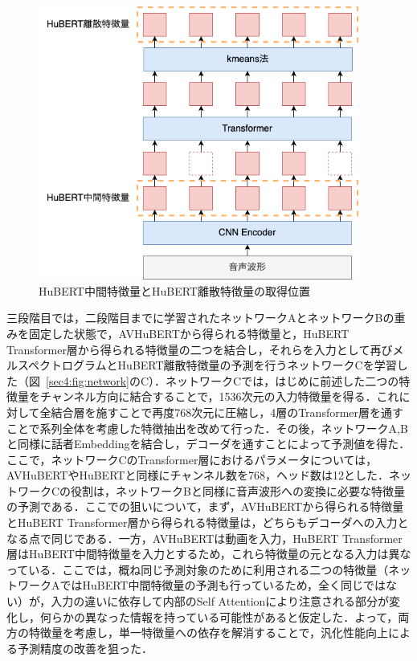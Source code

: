\documentclass[12pt]{jarticle}
\numberwithin{equation}{section}    %
\numberwithin{figure}{section}      %
\numberwithin{table}{section}      %
\begin{document}
\begin{figure}[bt]
    \centering
    \includegraphics[height=90mm]{./figure/sec4/model/hubert.png}
    \caption{HuBERT中間特徴量とHuBERT離散特徴量の取得位置}
    \label{sec4:fig:hubert}
\end{figure}

三段階目では，二段階目までに学習されたネットワークAとネットワークBの重みを固定した状態で，AVHuBERTから得られる特徴量と，HuBERT Transformer層から得られる特徴量の二つを結合し，それらを入力として再びメルスペクトログラムとHuBERT離散特徴量の予測を行うネットワークCを学習した（図~\ref{sec4:fig:network}のC）．ネットワークCでは，はじめに前述した二つの特徴量をチャンネル方向に結合することで，1536次元の入力特徴量を得る．これに対して全結合層を施すことで再度768次元に圧縮し，4層のTransformer層を通すことで系列全体を考慮した特徴抽出を改めて行った．その後，ネットワークA,Bと同様に話者Embeddingを結合し，デコーダを通すことによって予測値を得た．ここで，ネットワークCのTransformer層におけるパラメータについては，AVHuBERTやHuBERTと同様にチャンネル数を768，ヘッド数は12とした．ネットワークCの役割は，ネットワークBと同様に音声波形への変換に必要な特徴量の予測である．ここでの狙いについて，まず，AVHuBERTから得られる特徴量とHuBERT Transformer層から得られる特徴量は，どちらもデコーダへの入力となる点で同じである．一方，AVHuBERTは動画を入力，HuBERT Transformer層はHuBERT中間特徴量を入力とするため，これら特徴量の元となる入力は異なっている．ここでは，概ね同じ予測対象のために利用される二つの特徴量（ネットワークAではHuBERT中間特徴量の予測も行っているため，全く同じではない）が，入力の違いに依存して内部のSelf Attentionにより注意される部分が変化し，何らかの異なった情報を持っている可能性があると仮定した．よって，両方の特徴量を考慮し，単一特徴量への依存を解消することで，汎化性能向上による予測精度の改善を狙った．
\end{document}
